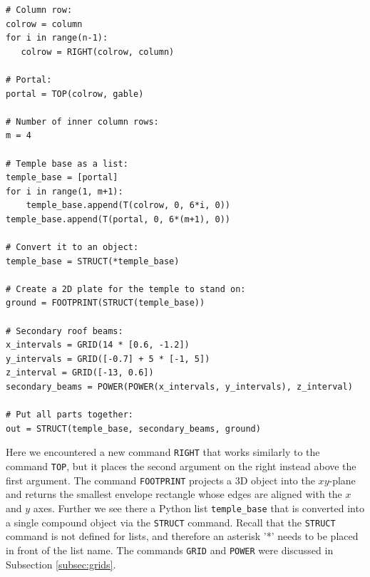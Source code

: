 {\small
\begin{bbox}
\begin{verbatim}# Column row:
colrow = column
for i in range(n-1):
   colrow = RIGHT(colrow, column)

# Portal:
portal = TOP(colrow, gable)

# Number of inner column rows:
m = 4

# Temple base as a list:
temple_base = [portal]
for i in range(1, m+1):
    temple_base.append(T(colrow, 0, 6*i, 0))
temple_base.append(T(portal, 0, 6*(m+1), 0))

# Convert it to an object:
temple_base = STRUCT(*temple_base)

# Create a 2D plate for the temple to stand on:
ground = FOOTPRINT(STRUCT(temple_base))

# Secondary roof beams:
x_intervals = GRID(14 * [0.6, -1.2])
y_intervals = GRID([-0.7] + 5 * [-1, 5])
z_interval = GRID([-13, 0.6])
secondary_beams = POWER(POWER(x_intervals, y_intervals), z_interval)

# Put all parts together:
out = STRUCT(temple_base, secondary_beams, ground)
\end{verbatim}
\end{bbox}
}
\vspace{6mm}

\noindent
Here we encountered a new command {\tt RIGHT}
that works similarly to the command {\tt TOP}, but it places
the second argument on the right instead above the
first argument. The command {\tt FOOTPRINT} projects 
a 3D object into the $xy$-plane and returns the smallest 
envelope rectangle whose edges are aligned with the $x$ and 
$y$ axes. Further we see there a Python list {\tt temple\_base}
that is converted into a single compound object via the {\tt STRUCT} 
command. Recall that the {\tt STRUCT} command is not defined for lists,
and therefore an asterisk '*' needs to be placed in front
of the list name. The commands {\tt GRID} and {\tt POWER} were
discussed in Subsection \ref{subsec:grids}.


